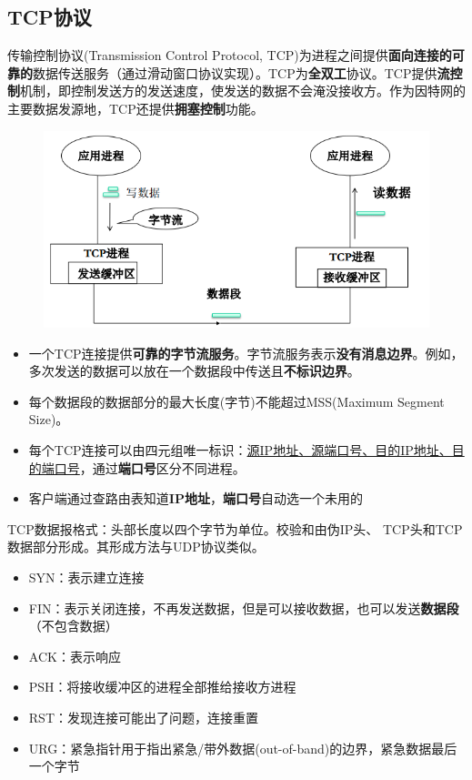 \subsection{TCP协议}
传输控制协议(Transmission Control Protocol, TCP)为进程之间提供\textbf{面向连接的可靠的}数据传送服务（通过滑动窗口协议实现）。TCP为\textbf{全双工}协议。TCP提供\textbf{流控制}机制，即控制发送方的发送速度，使发送的数据不会淹没接收方。作为因特网的主要数据发源地，TCP还提供\textbf{拥塞控制}功能。
\begin{figure}[H]
    \centering
    \includegraphics[width=0.5\linewidth]{fig/TCP.PNG}
\end{figure}

\begin{itemize}
\item 一个TCP连接提供\textbf{可靠的字节流服务}。字节流服务表示\textbf{没有消息边界}。例如，多次发送的数据可以放在一个数据段中传送且\textbf{不标识边界}。
\item 每个数据段的数据部分的最大长度(字节)不能超过MSS(Maximum Segment Size)。
\item 每个TCP连接可以由四元组唯一标识：\underline{源IP地址、源端口号、目的IP地址、目的端口号}，通过\textbf{端口号}区分不同进程。
\item 客户端通过查路由表知道\textbf{IP地址}，\textbf{端口号}自动选一个未用的
\end{itemize}

TCP数据报格式：头部长度以四个字节为单位。校验和由伪IP头、 TCP头和TCP数据部分形成。其形成方法与UDP协议类似。
\begin{itemize}
\item SYN：表示建立连接
\item FIN：表示关闭连接，不再发送数据，但是可以接收数据，也可以发送\textbf{数据段}（不包含数据）
\item ACK：表示响应
\item PSH：将接收缓冲区的进程全部推给接收方进程
\item RST：发现连接可能出了问题，连接重置
\item URG：紧急指针用于指出紧急/带外数据(out-of-band)的边界，紧急数据最后一个字节
\end{itemize}

